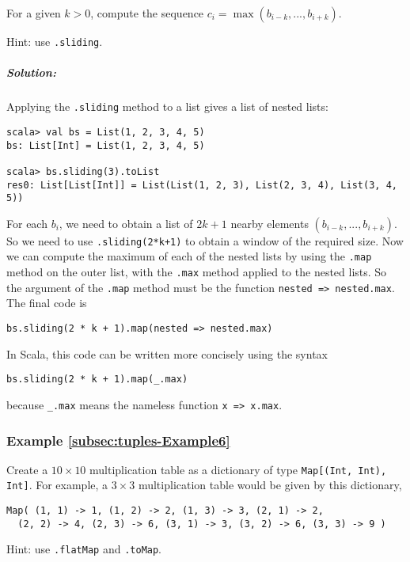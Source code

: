 For a given $k>0$, compute the sequence $c_{i}=\max(b_{i-k},...,b_{i+k})$.

Hint:  use \lstinline!.sliding!.

\subparagraph{Solution:}

Applying the \lstinline!.sliding!
method to a list gives a list of nested lists:
\begin{lstlisting}
scala> val bs = List(1, 2, 3, 4, 5)
bs: List[Int] = List(1, 2, 3, 4, 5)

scala> bs.sliding(3).toList
res0: List[List[Int]] = List(List(1, 2, 3), List(2, 3, 4), List(3, 4, 5)) 
\end{lstlisting}
For each $b_{i}$, we need to obtain a list of $2k+1$ nearby elements
$\left(b_{i-k},...,b_{i+k}\right)$. So we need to use \lstinline!.sliding(2*k+1)!
to obtain a window of the required size. Now we can compute the maximum
of each of the nested lists by using the \lstinline!.map!
method on the outer list, with the \lstinline!.max!
method applied to the nested lists. So the argument of the \lstinline!.map!
method must be the function \lstinline!nested => nested.max!.
The final code is

\begin{lstlisting}
bs.sliding(2 * k + 1).map(nested => nested.max)
\end{lstlisting}
In Scala, this code can be written more concisely using the syntax
\begin{lstlisting}
bs.sliding(2 * k + 1).map(_.max)
\end{lstlisting}
because \lstinline!_.max!
means the nameless function \lstinline!x => x.max!.

\subsubsection{Example \label{subsec:tuples-Example6}\ref{subsec:tuples-Example6}}

Create a $10\times10$ multiplication table as a dictionary of type
\lstinline!Map[(Int, Int), Int]!.
For example, a $3\times3$ multiplication table would be given by
this dictionary,
\begin{lstlisting}
Map( (1, 1) -> 1, (1, 2) -> 2, (1, 3) -> 3, (2, 1) -> 2,
  (2, 2) -> 4, (2, 3) -> 6, (3, 1) -> 3, (3, 2) -> 6, (3, 3) -> 9 )
\end{lstlisting}
Hint: use \lstinline!.flatMap!
and \lstinline!.toMap!.

